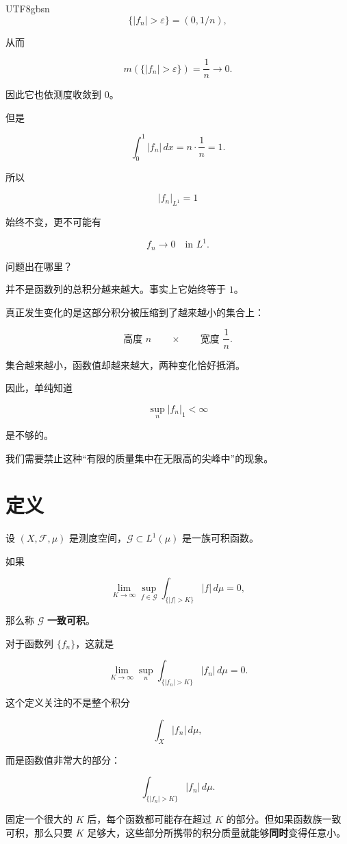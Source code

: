 \documentclass[11pt]{article}
\begin{document}
\begin{CJK*}{UTF8}{gbsn}
\[
\{|f_n|>\varepsilon\}
=
(0,1/n),
\]

从而

\[
m(\{|f_n|>\varepsilon\})
=
\frac1n\to0.
\]

因此它也依测度收敛到 $0$。

但是

\[
\int_0^1|f_n|\,dx = n\cdot\frac{1}{n} = 1.
\]

所以

\[
|f_n|_{L^1}=1
\]

始终不变，更不可能有

\[
f_n\to0
\quad\text{in }L^1.
\]

问题出在哪里？

并不是函数列的总积分越来越大。事实上它始终等于 $1$。

真正发生变化的是这部分积分被压缩到了越来越小的集合上：

\[
\text{高度 }n
\qquad
\times
\qquad
\text{宽度 }\frac1n.
\]

集合越来越小，函数值却越来越大，两种变化恰好抵消。

因此，单纯知道

\[
\sup_n|f_n|_1<\infty
\]

是不够的。

我们需要禁止这种“有限的质量集中在无限高的尖峰中”的现象。


\section{定义}


设 $(X,\mathcal F,\mu)$ 是测度空间，$\mathcal G\subset L^1(\mu)$ 是一族可积函数。

如果

\[
\lim_{K\to\infty}
\sup_{f\in\mathcal G}
\int_{\{|f|>K\}}|f|\,d\mu
=
0,
\]

那么称 $\mathcal G$ \textbf{一致可积}。

对于函数列 $\{f_n\}$，这就是

\[
\lim_{K\to\infty}
\sup_n
\int_{\{|f_n|>K\}}
|f_n|\,d\mu
=
0.

\]

这个定义关注的不是整个积分

\[
\int_X|f_n|\,d\mu,
\]

而是函数值非常大的部分：

\[
\int_{\{|f_n|>K\}}|f_n|\,d\mu.
\]

固定一个很大的 $K$ 后，每个函数都可能存在超过 $K$ 的部分。但如果函数族一致可积，那么只要 $K$ 足够大，这些部分所携带的积分质量就能够\textbf{同时}变得任意小。


\end{CJK*}
\end{document}
